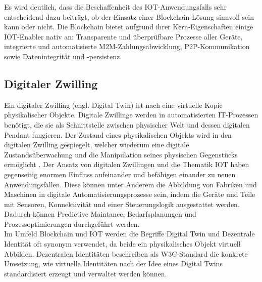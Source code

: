 Es wird deutlich, dass die Beschaffenheit des \ac{IOT}-Anwendungsfalls sehr entscheidend dazu beiträgt, ob der Einsatz einer Blockchain-Lösung sinnvoll sein kann oder nicht. Die Blockchain bietet aufgrund ihrer Kern-Eigenschaften einige IOT-Enabler nativ an: Transparente und überprüfbare Prozesse aller Geräte, integrierte und automatisierte \ac{M2M}-Zahlungsabwicklung, \ac{P2P}-Kommunikation sowie Datenintegrität und -persistenz.

\subsection{Digitaler Zwilling}
\label{subsec:fundamentals:iot:digitaltwins}
Ein digitaler Zwilling (engl. Digital Twin) ist nach \cite{deloitte2018} eine virtuelle Kopie physikalischer Objekte. Digitale Zwillinge werden in automatisierten IT-Prozessen benötigt, die sie als Schnittstelle zwischen physischer Welt und dessen digitalen Pendant fungieren. Der Zustand eines physikalischen Objekts wird in den digitalen Zwilling gespiegelt, welcher wiederum eine digitale Zustandsüberwachung und die Manipulation seines physischen Gegenstücks ermöglicht \cite{deloitte2018}. Der Ansatz von digitalen Zwillingen und die Thematik \ac{IOT} haben gegenseitig enormen Einfluss aufeinander und befähigen einander zu neuen Anwendungsfällen. Diese können unter Anderem die Abbildung von Fabriken und Maschinen in digitale Automatisierungsprozesse sein, indem die Geräte und Teile mit Sensoren, Konnektivität und einer Steuerungslogik ausgestattet werden. Dadurch können Predictive Maintance, Bedarfsplanungen und Prozessoptimierungen durchgeführt werden.\\
Im Umfeld Blockchain und \ac{IOT} werden die Begriffe Digital Twin und Dezentrale Identität oft synonym verwendet, da beide ein physikalisches Objekt virtuell Abbilden. Dezentralen Identitäten beschreiben als \ac{W3C}-Standard die konkrete Umsetzung, wie virtuelle Identitäten nach der Idee eines Digital Twins standardisiert erzeugt und verwaltet werden können.
